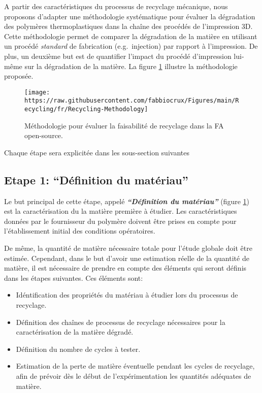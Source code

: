 \documentclass[
]{article}
\providecommand{\tightlist}{%
  \setlength{\itemsep}{0pt}\setlength{\parskip}{0pt}}
\begin{document}
A partir des caractéristiques du processus de recyclage mécanique, nous proposons d'adapter une méthodologie systématique pour évaluer la dégradation des polymères thermoplastiques dans la chaîne des procédés de l'impression 3D.
Cette méthodologie permet de comparer la dégradation de la matière en utilisant un procédé \emph{standard} de fabrication (e.g.~injection) par rapport à l'impression. De plus, un deuxième but est de quantifier l'impact du procédé d'impression lui-même sur la dégradation de la matière.
La figure \ref{fig:Recycling-Methodology-Fr} illustre la méthodologie proposée.

\begin{figure}

{\centering \texttt{[image: https://raw.githubusercontent.com/fabbiocrux/Figures/main/Recycling/fr/Recycling-Methodology]} 

}

\caption{Méthodologie pour évaluer la faisabilité de recyclage dans la FA open-source.}\label{fig:Recycling-Methodology-Fr}
\end{figure}

Chaque étape sera explicitée dans les sous-section suivantes

\hypertarget{etape-1-duxe9finition-du-matuxe9riau}{%
\subsection{Etape 1: ``Définition du matériau''}\label{etape-1-duxe9finition-du-matuxe9riau}}

Le but principal de cette étape, appelé \textbf{\emph{``Définition du matériau''}} (figure \ref{fig:Recycling-Methodology-Fr}) est la caractérisation du la matière première à étudier. Les caractéristiques données par le fournisseur du polymère doivent être prises en compte pour l'établissement initial des conditions opératoires.

De même, la quantité de matière nécessaire totale pour l'étude globale doit être estimée. Cependant, dans le but d'avoir une estimation réelle de la quantité de matière, il est nécessaire de prendre en compte des éléments qui seront définis dans les étapes suivantes. Ces éléments sont:

\begin{itemize}
\tightlist
\item
  Idéntification des propriétés du matériau à étudier lors du processus de recyclage.
\item
  Définition des chaînes de processus de recyclage nécessaires pour la caractérisation de la matière dégradé.
\item
  Définition du nombre de cycles à tester.
\item
  Estimation de la perte de matière éventuelle pendant les cycles de recyclage, afin de prévoir dès le début de l'expérimentation les quantités adéquates de matière.
\end{itemize}
\end{document}
